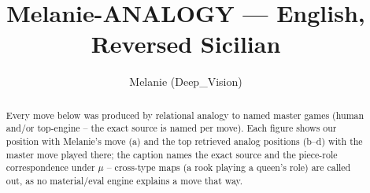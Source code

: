 \documentclass[11pt]{article}
\title{Melanie-ANALOGY — English, Reversed Sicilian}
\author{Melanie (Deep\_Vision)}
\date{}
\begin{document}
\maketitle

\begin{abstract}Every move below was produced by relational analogy to named master games (human and/or top-engine -- the exact source is named per move). Each figure shows our position with Melanie's move (a) and the top retrieved analog positions (b--d) with the master move played there; the caption names the exact source and the piece-role correspondence under $\mu$ -- cross-type maps (a rook playing a queen's role) are called out, as no material/eval engine explains a move that way.\end{abstract}

\begin{figure}[p]\centering
\begin{subfigure}{0.46\textwidth}\centering
\resizebox{\linewidth}{!}{%
\newchessgame
\chessboard[
  setfen={r1bqkb1r/ppp2ppp/1nn5/4p3/7P/2N2NP1/PP1PPPB1/R1BQK2R b KQkq - 0 7},
  showmover=false,
  pgfstyle=straightmove, color=movearrow, markmove={f8-e7}
]}
\caption{}
\end{subfigure}\hfill
\begin{subfigure}{0.46\textwidth}\centering
\resizebox{\linewidth}{!}{%
\newchessgame
\chessboard[
  setfen={r1bq1rk1/pp1pppbp/2n2np1/8/4P3/1NN1B3/PPP2PPP/R2QKB1R w KQ - 5 8},
  showmover=false,
  pgfstyle=straightmove, color=movearrow, markmove={f1-e2}
]}
\caption{}
\end{subfigure}
\\[4pt]
\begin{subfigure}{0.46\textwidth}\centering
\resizebox{\linewidth}{!}{%
\newchessgame
\chessboard[
  setfen={r1bq1rk1/pp1pppbp/2n2np1/8/4P3/1NN1B3/PPP2PPP/R2QKB1R w KQ - 5 8},
  showmover=false,
  pgfstyle=straightmove, color=movearrow, markmove={f1-e2}
]}
\caption{}
\end{subfigure}\hfill
\begin{subfigure}{0.46\textwidth}\centering
\resizebox{\linewidth}{!}{%
\newchessgame
\chessboard[
  setfen={r1bqkb1r/ppp2ppp/1nn5/4p3/8/2N2NP1/PP1PPPBP/R1BQ1RK1 b kq - 3 7},
  showmover=false,
  pgfstyle=straightmove, color=movearrow, markmove={f8-e7}
]}
\caption{}
\end{subfigure}

\end{figure}
\end{document}
